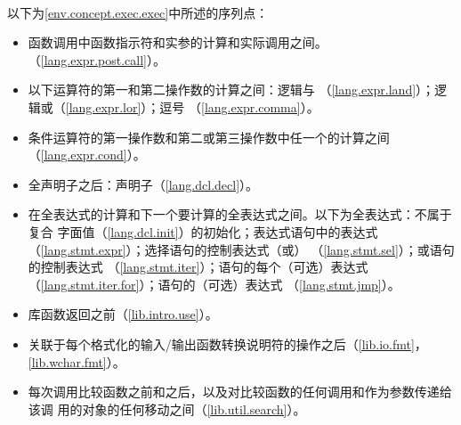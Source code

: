 
\paragraph{}
以下为\ref{env.concept.exec.exec}中所述的序列点：
\begin{itemize}
  \item{函数调用中函数指示符和实参的计算和实际调用之间。
    （\ref{lang.expr.post.call}）。}
  \item{以下运算符的第一和第二操作数的计算之间：逻辑与\tm{\&\&}
    （\ref{lang.expr.land}）；逻辑或\tm{||}（\ref{lang.expr.lor}）；逗号\tm{,}
    （\ref{lang.expr.comma}）。}
  \item{条件运算符的第一操作数和第二或第三操作数中任一个的计算之间
    （\ref{lang.expr.cond}）。}
  \item{全声明子之后：声明子（\ref{lang.dcl.decl}）。}
  \item{在全表达式的计算和下一个要计算的全表达式之间。以下为全表达式：不属于复合
    字面值（\ref{lang.dcl.init}）的初始化；表达式语句中的表达式
    （\ref{lang.stmt.expr}）；选择语句的控制表达式（或）
    （\ref{lang.stmt.sel}）；或语句的控制表达式
    （\ref{lang.stmt.iter}）；语句的每个（可选）表达式
    （\ref{lang.stmt.iter.for}）；语句的（可选）表达式
    （\ref{lang.stmt.jmp}）。}
  \item{库函数返回之前（\ref{lib.intro.use}）。}
  \item{关联于每个格式化的输入/输出函数转换说明符的操作之后（\ref{lib.io.fmt}，
    \ref{lib.wchar.fmt}）。}
  \item{每次调用比较函数之前和之后，以及对比较函数的任何调用和作为参数传递给该调
    用的对象的任何移动之间（\ref{lib.util.search}）。}
\end{itemize}
